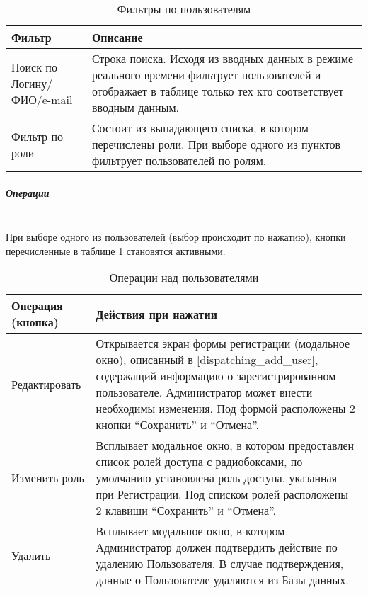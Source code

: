 		               \begin{table}[!h]  
			               \begin{center}
			               \caption {Фильтры по пользователям}
			               \setlength{\extrarowheight}{2mm}
			               \begin{tabular}{|p{5cm}|p{10cm}|}
			                   \hline     \textbf{Фильтр}&\textbf{Описание} \\ [2mm]

			                   \hline  Поиск по Логину/ФИО/e-mail & Строка поиска. Исходя из вводных данных в режиме реального времени фильтрует пользователей и отображает в таблице только тех кто соответствует вводным данным. \\ [2mm]
			                   \hline   Фильтр по роли  & Состоит из выпадающего списка, в котором перечислены роли. При выборе одного из пунктов фильтрует пользователей по ролям. \\ [2mm]
			                   \hline
			               \end{tabular}
			               \end{center}
		               \end{table} 

					\subparagraph{Операции}\mbox{}\\

						При выборе одного из пользователей (выбор происходит по нажатию), кнопки перечисленные в таблице \ref{user_managment_operations} становятся активными. 

		                \begin{table}[!h] 
			                \begin{center}
			                \caption {Операции над пользователями}
                            \label{user_managment_operations}
			                \setlength{\extrarowheight}{2mm}
			                \begin{tabular}{|p{5cm}|p{10cm}|} 
			                   \hline     \textbf{Операция (кнопка)}&\textbf{Действия при нажатии} \\ [2mm]

			                   \hline  Редактировать & Открывается экран формы регистрации (модальное окно), описанный в \ref{dispatching_add_user}, содержащий информацию о зарегистрированном пользователе. Администратор может внести необходимы изменения. Под формой расположены 2 кнопки “Сохранить” и “Отмена”. \\ [2mm]
			                   \hline  Изменить роль & Всплывает модальное окно, в котором предоставлен список ролей доступа с радиобоксами, по умолчанию установлена роль доступа, указанная при Регистрации. Под списком ролей расположены 2 клавиши “Сохранить” и “Отмена”. \\ [2mm]
			                   \hline Удалить & Всплывает модальное окно, в котором Администратор должен подтвердить действие по удалению Пользователя. В случае подтверждения, данные о Пользователе удаляются из Базы данных. \\ [2mm]
			                   \hline
			                \end{tabular}
			                \end{center}
		                \end{table}

